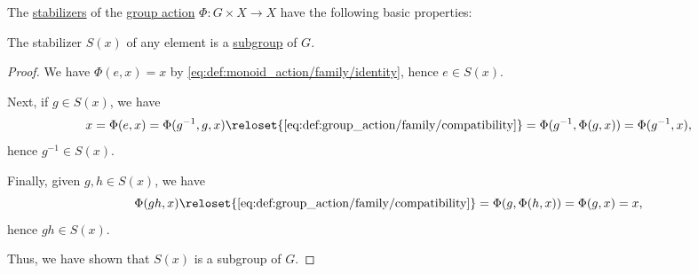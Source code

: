 \begin{proposition}\label{thm:def:group_action_stabilizer}
  The \hyperref[def:group_action_stabilizer]{stabilizers} of the \hyperref[def:group_action]{group action} \( \Phi: G \times X \to X \) have the following basic properties:
  \begin{thmenum}
     The stabilizer \( S(x) \) of any element is a \hyperref[def:group/subobject]{subgroup} of \( G \).
  \end{thmenum}
\end{proposition}
\begin{proof}
   We have \( \Phi(e, x) = x \) by \eqref{eq:def:monoid_action/family/identity}, hence \( e \in S(x) \).

  Next, if \( g \in S(x) \), we have
  \begin{equation*}
    x
    =
    \Phi(e, x)
    =
    \Phi(g^{-1}, g, x)
    \reloset {\eqref{eq:def:group_action/family/compatibility}} =
    \Phi(g^{-1}, \Phi(g, x))
    =
    \Phi(g^{-1}, x),
  \end{equation*}
  hence \( g^{-1} \in S(x) \).

  Finally, given \( g, h \in S(x) \), we have
  \begin{equation*}
    \Phi(gh, x)
    \reloset {\eqref{eq:def:group_action/family/compatibility}} =
    \Phi(g, \Phi(h, x))
    =
    \Phi(g, x)
    =
    x,
  \end{equation*}
  hence \( gh \in S(x) \).

  Thus, we have shown that \( S(x) \) is a subgroup of \( G \).
\end{proof}

